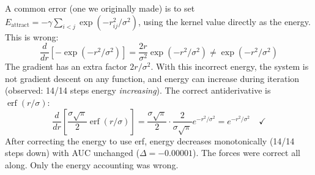 \documentclass{article}
\DeclareMathOperator{\erf}{erf}
\begin{document}
A common error (one we originally made) is to set $E_{\text{attract}} = -\gamma\sum_{i<j}\exp(-r_{ij}^2/\sigma^2)$, using the kernel value directly as the energy. This is wrong:
\begin{equation}
\frac{d}{dr}\left[-\exp(-r^2/\sigma^2)\right] = \frac{2r}{\sigma^2}\exp(-r^2/\sigma^2) \neq \exp(-r^2/\sigma^2)
\end{equation}
The gradient has an extra factor $2r/\sigma^2$. With this incorrect energy, the system is not gradient descent on any function, and energy can increase during iteration (observed: 14/14 steps energy \emph{increasing}). The correct antiderivative is $\erf(r/\sigma)$:
\begin{equation}
\frac{d}{dr}\left[\frac{\sigma\sqrt{\pi}}{2}\erf(r/\sigma)\right] = \frac{\sigma\sqrt{\pi}}{2} \cdot \frac{2}{\sigma\sqrt{\pi}}e^{-r^2/\sigma^2} = e^{-r^2/\sigma^2} \quad \checkmark
\end{equation}
After correcting the energy to use erf, energy decreases monotonically (14/14 steps down) with AUC unchanged ($\Delta = -0.00001$). The forces were correct all along. Only the energy accounting was wrong.
\end{document}
